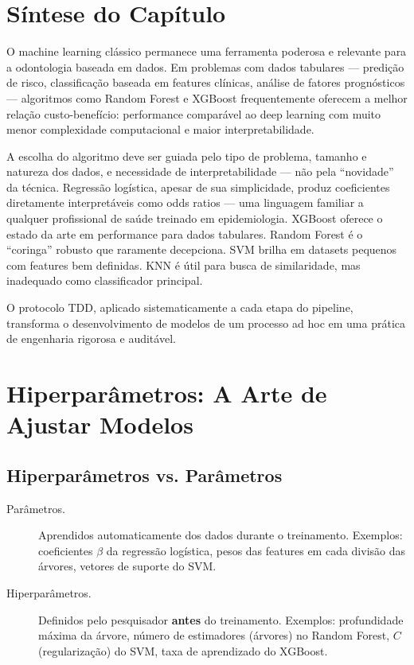 \section{Síntese do Capítulo}

O machine learning clássico permanece uma ferramenta poderosa e relevante para a odontologia baseada em dados. Em problemas com dados tabulares — predição de risco, classificação baseada em features clínicas, análise de fatores prognósticos — algoritmos como Random Forest e XGBoost frequentemente oferecem a melhor relação custo-benefício: performance comparável ao deep learning com muito menor complexidade computacional e maior interpretabilidade.

A escolha do algoritmo deve ser guiada pelo tipo de problema, tamanho e natureza dos dados, e necessidade de interpretabilidade — não pela ``novidade'' da técnica. Regressão logística, apesar de sua simplicidade, produz coeficientes diretamente interpretáveis como odds ratios — uma linguagem familiar a qualquer profissional de saúde treinado em epidemiologia. XGBoost oferece o estado da arte em performance para dados tabulares. Random Forest é o ``coringa'' robusto que raramente decepciona. SVM brilha em datasets pequenos com features bem definidas. KNN é útil para busca de similaridade, mas inadequado como classificador principal.

O protocolo TDD, aplicado sistematicamente a cada etapa do pipeline, transforma o desenvolvimento de modelos de um processo ad hoc em uma prática de engenharia rigorosa e auditável.

\section{Hiperparâmetros: A Arte de Ajustar Modelos}

\subsection{Hiperparâmetros vs. Parâmetros}

\begin{description}
    \item[Parâmetros.] Aprendidos automaticamente dos dados durante o treinamento. Exemplos: coeficientes $\beta$ da regressão logística, pesos das features em cada divisão das árvores, vetores de suporte do SVM.
    \item[Hiperparâmetros.] Definidos pelo pesquisador \textbf{antes} do treinamento. Exemplos: profundidade máxima da árvore, número de estimadores (árvores) no Random Forest, $C$ (regularização) do SVM, taxa de aprendizado do XGBoost.
\end{description}

